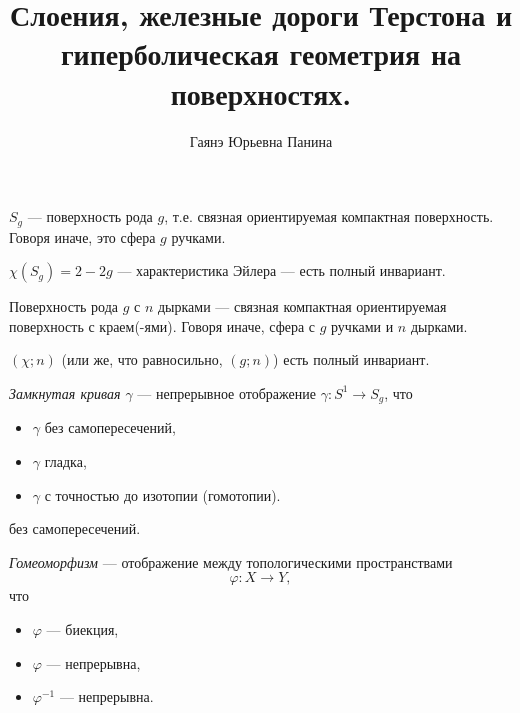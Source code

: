 \documentclass[12pt,a4paper]{article}
\title{Слоения, железные дороги Терстона и гиперболическая геометрия на поверхностях.}
\author{Гаянэ Юрьевна Панина}
\begin{document}
    \maketitle

    \begin{definition}
        $S_g$ --- поверхность рода $g$, т.е. связная ориентируемая компактная поверхность. Говоря иначе, это сфера $g$ ручками.
    \end{definition}

    \begin{lemma}
        $\chi(S_g) = 2 - 2g$ --- характеристика Эйлера --- есть полный инвариант.
    \end{lemma}

    \begin{definition}
        Поверхность рода $g$ с $n$ дырками --- связная компактная ориентируемая поверхность с краем(-ями). Говоря иначе, сфера с $g$ ручками и $n$ дырками.
    \end{definition}

    \begin{lemma}
        $(\chi; n)$ (или же, что равносильно, $(g; n)$) есть полный инвариант.
    \end{lemma}

    \begin{definition}
        \emph{Замкнутая кривая $\gamma$} --- непрерывное отображение $\gamma: S^1 \to S_g$, что
        \begin{itemize}
            \item $\gamma$ без самопересечений,
            \item $\gamma$ гладка,
            \item $\gamma$ с точностью до изотопии (гомотопии).
        \end{itemize} без самопересечений.
    \end{definition}

    \begin{definition}
        \emph{Гомеоморфизм} --- отображение между топологическими пространствами
        \[\varphi: X \to Y,\]
        что
        \begin{itemize}
            \item $\varphi$ --- биекция,
            \item $\varphi$ --- непрерывна,
            \item $\varphi^{-1}$ --- непрерывна.
        \end{itemize}
    \end{definition}
\end{document}
